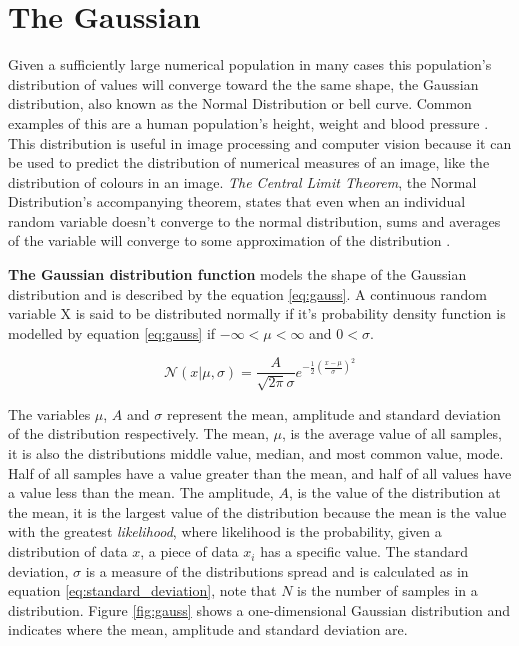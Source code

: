 \section{The Gaussian}
\label{section:gaussian}

Given a sufficiently large numerical population in many cases this population's distribution of values will converge toward the the same shape, the Gaussian distribution, also known as the Normal Distribution or bell curve. Common examples of this are a human population's height, weight and blood pressure \cite{modern_statistics}. This distribution is useful in image processing and computer vision because it can be used to predict the distribution of numerical measures of an image, like the distribution of colours in an image. \emph{The Central Limit Theorem}, the Normal Distribution's accompanying theorem, states that even when an individual random variable doesn't converge to the normal distribution, sums and averages of the variable will converge to some approximation of the distribution \cite{modern_statistics}. 

\textbf{The Gaussian distribution function} models the shape of the Gaussian distribution and is described by the equation \ref{eq:gauss}. A continuous random variable X is said to be distributed normally if it's probability density function is modelled by equation \ref{eq:gauss} if $-\infty < \mu < \infty$ and $0 < \sigma$.


\begin{equation}
  \mathcal{N}(x|\mu,\sigma) = \frac{A}{\sqrt{2\pi}\sigma}e^{-\frac{1}{2}(\frac{x-\mu}{\sigma})^2}
\label{eq:gauss}
\end{equation}

The variables $\mu$, $A$ and $\sigma$ represent the mean, amplitude and standard deviation of the distribution respectively. The mean, $\mu$, is the average value of all samples, it is also the distributions middle value, median, and most common value, mode. Half of all samples have a value greater than the mean, and half of all values have a value less than the mean. The amplitude, $A$, is the value of the distribution at the mean, it is the largest value of the distribution because the mean is the value with the greatest \emph{likelihood}, where likelihood is the probability, given a distribution of data $x$, a piece of data $x_i$ has a specific value. The standard deviation, $\sigma$ is a measure of the distributions spread and is calculated as in equation \ref{eq:standard_deviation}, note that $N$ is the number of samples in a distribution. Figure \ref{fig:gauss} shows a one-dimensional Gaussian distribution and indicates where the mean, amplitude and standard deviation are.

